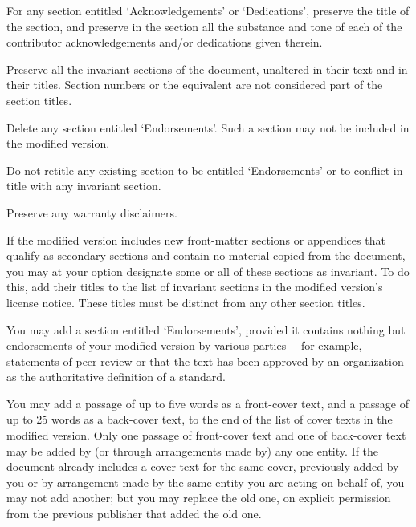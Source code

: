 \begin{multicols}{3}
\begin{anumerate}
\item For any section entitled \enquote*{Acknowledgements} or \enquote*{Dedications}, preserve the title of the section, and preserve in the section all the substance and tone of each of the contributor acknowledgements and\slash or dedications given there\-in.

\item Preserve all the invariant sections of the document, unaltered in their text and in their titles. Section numbers or the equivalent are not considered part of the section titles.

\item Delete any section entitled \enquote*{Endorsements}. Such a section may not be included in the modified version.

\item Do not retitle any existing section to be entitled \enquote*{Endorsements} or to conflict in title with any invariant section.

\item Preserve any warranty disclaimers.

\end{anumerate}

\noindent If the modified version includes new front-matter sections or appendices that qualify as secondary sections and contain no material copied from the document, you may at your option designate some or all of these sections as invariant. To do this, add their titles to the list of invariant sections in the modified version's license notice. These titles must be distinct from any other section titles.

You may add a section entitled \enquote*{Endorsements}, provided it contains nothing but endorsements of your modified version by various parties~-- for example, statements of peer review or that the text has been approved by an organization as the authoritative definition of a standard.

You may add a passage of up to five words as a front-cover text, and a passage of up to 25 words as a back-cover text, to the end of the list of cover texts in the modified version. Only one passage of front-cover text and one of back-cover text may be added by (or through arrangements made by) any one entity. If the document already includes a cover text for the same cover, previously added by you or by arrangement made by the same entity you are acting on behalf of, you may not add another; but you may replace the old one, on explicit permission from the previous publisher that added the old one.


\end{multicols}
